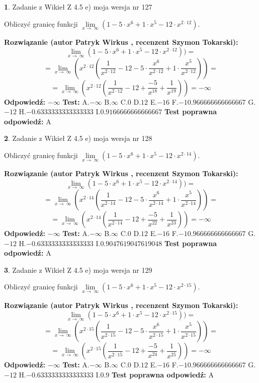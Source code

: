 \documentclass[12pt, a4paper]{article}
\theoremstyle{definition} %
\newtheorem{zad}{}
\newcommand{\zadStart}[1]{\begin{zad}#1\newline}
\newcommand{\zadStop}{\end{zad}}
\newcommand{\rozwStart}[2]{\noindent \textbf{Rozwiązanie (autor #1 , recenzent #2): }\newline}
\newcommand{\rozwStop}{\newline}
\newcommand{\odpStart}{\noindent \textbf{Odpowiedź:}\newline}
\newcommand{\odpStop}{\newline}
\newcommand{\testStart}{\noindent \textbf{Test:}\newline}
\newcommand{\testStop}{\newline}
\newcommand{\kluczStart}{\noindent \textbf{Test poprawna odpowiedź:}\newline}
\newcommand{\kluczStop}{\newline}
\begin{document}
\zadStart{Zadanie z Wikieł Z 4.5 e) moja wersja nr 127}


Obliczyć granicę funkcji  $\lim\limits_{x\to\ \infty}(1 - 5 \cdot x^{6}+1 \cdot x^{5}- 12 \cdot x^{2\cdot12})$.
\zadStop
\rozwStart{Patryk Wirkus}{Szymon Tokarski}
$$\lim\limits_{x\to\ \infty}(1 - 5 \cdot x^{6}+1 \cdot x^{5}- 12 \cdot x^{2\cdot12}))=$$
$$=\lim\limits_{x\to\ \infty}(x^{2\cdot12}(\frac{1}{x^{2\cdot12}}-12 -5 \cdot \frac{x^{6}}{x^{2\cdot12}}+1 \cdot \frac{x^{5}}{x^{2\cdot12}}))=$$
$$=\lim\limits_{x\to\ \infty}(x^{2\cdot12}(\frac{1}{x^{2\cdot12}}-12 + \frac{-5}{x^{18}}+ \frac{1}{x^{19}}))=-\infty$$
\rozwStop
\odpStart
$-\infty$
\odpStop
\testStart
A.$-\infty$ B.$\infty$ C.$0$ D.$12$ E.$-16$
F.$-10.966666666666667$ G.$-12$
H.$-0.6333333333333333$
I.$0.9166666666666667$
\testStop
\kluczStart
A
\kluczStop



\zadStart{Zadanie z Wikieł Z 4.5 e) moja wersja nr 128}


Obliczyć granicę funkcji  $\lim\limits_{x\to\ \infty}(1 - 5 \cdot x^{6}+1 \cdot x^{5}- 12 \cdot x^{2\cdot14})$.
\zadStop
\rozwStart{Patryk Wirkus}{Szymon Tokarski}
$$\lim\limits_{x\to\ \infty}(1 - 5 \cdot x^{6}+1 \cdot x^{5}- 12 \cdot x^{2\cdot14}))=$$
$$=\lim\limits_{x\to\ \infty}(x^{2\cdot14}(\frac{1}{x^{2\cdot14}}-12 -5 \cdot \frac{x^{6}}{x^{2\cdot14}}+1 \cdot \frac{x^{5}}{x^{2\cdot14}}))=$$
$$=\lim\limits_{x\to\ \infty}(x^{2\cdot14}(\frac{1}{x^{2\cdot14}}-12 + \frac{-5}{x^{22}}+ \frac{1}{x^{23}}))=-\infty$$
\rozwStop
\odpStart
$-\infty$
\odpStop
\testStart
A.$-\infty$ B.$\infty$ C.$0$ D.$12$ E.$-16$
F.$-10.966666666666667$ G.$-12$
H.$-0.6333333333333333$
I.$0.9047619047619048$
\testStop
\kluczStart
A
\kluczStop



\zadStart{Zadanie z Wikieł Z 4.5 e) moja wersja nr 129}


Obliczyć granicę funkcji  $\lim\limits_{x\to\ \infty}(1 - 5 \cdot x^{6}+1 \cdot x^{5}- 12 \cdot x^{2\cdot15})$.
\zadStop
\rozwStart{Patryk Wirkus}{Szymon Tokarski}
$$\lim\limits_{x\to\ \infty}(1 - 5 \cdot x^{6}+1 \cdot x^{5}- 12 \cdot x^{2\cdot15}))=$$
$$=\lim\limits_{x\to\ \infty}(x^{2\cdot15}(\frac{1}{x^{2\cdot15}}-12 -5 \cdot \frac{x^{6}}{x^{2\cdot15}}+1 \cdot \frac{x^{5}}{x^{2\cdot15}}))=$$
$$=\lim\limits_{x\to\ \infty}(x^{2\cdot15}(\frac{1}{x^{2\cdot15}}-12 + \frac{-5}{x^{24}}+ \frac{1}{x^{25}}))=-\infty$$
\rozwStop
\odpStart
$-\infty$
\odpStop
\testStart
A.$-\infty$ B.$\infty$ C.$0$ D.$12$ E.$-16$
F.$-10.966666666666667$ G.$-12$
H.$-0.6333333333333333$
I.$0.9$
\testStop
\kluczStart
A
\kluczStop
\end{document}

